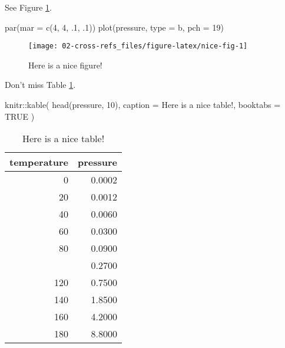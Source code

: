 \documentclass[
]{book}
\newenvironment{Shaded}{\begin{snugshade}}{\end{snugshade}}
\newcommand{\AttributeTok}[1]{\textcolor[rgb]{0.77,0.63,0.00}{#1}}
\newcommand{\ConstantTok}[1]{\textcolor[rgb]{0.00,0.00,0.00}{#1}}
\newcommand{\DecValTok}[1]{\textcolor[rgb]{0.00,0.00,0.81}{#1}}
\newcommand{\FunctionTok}[1]{\textcolor[rgb]{0.00,0.00,0.00}{#1}}
\newcommand{\NormalTok}[1]{#1}
\newcommand{\SpecialCharTok}[1]{\textcolor[rgb]{0.00,0.00,0.00}{#1}}
\newcommand{\StringTok}[1]{\textcolor[rgb]{0.31,0.60,0.02}{#1}}
\theoremstyle{definition}
\theoremstyle{definition}
\theoremstyle{definition}
\theoremstyle{definition}
\theoremstyle{remark}
\begin{document}
See Figure \ref{fig:nice-fig}.

\begin{Shaded}
\begin{Highlighting}[]
\FunctionTok{par}\NormalTok{(}\AttributeTok{mar =} \FunctionTok{c}\NormalTok{(}\DecValTok{4}\NormalTok{, }\DecValTok{4}\NormalTok{, .}\DecValTok{1}\NormalTok{, .}\DecValTok{1}\NormalTok{))}
\FunctionTok{plot}\NormalTok{(pressure, }\AttributeTok{type =} \StringTok{\textquotesingle{}b\textquotesingle{}}\NormalTok{, }\AttributeTok{pch =} \DecValTok{19}\NormalTok{)}
\end{Highlighting}
\end{Shaded}

\begin{figure}

{\centering \texttt{[image: 02-cross-refs\_files/figure-latex/nice-fig-1]} 

}

\caption{Here is a nice figure!}\label{fig:nice-fig}
\end{figure}

Don't miss Table \ref{tab:nice-tab}.

\begin{Shaded}
\begin{Highlighting}[]
\NormalTok{knitr}\SpecialCharTok{::}\FunctionTok{kable}\NormalTok{(}
  \FunctionTok{head}\NormalTok{(pressure, }\DecValTok{10}\NormalTok{), }\AttributeTok{caption =} \StringTok{\textquotesingle{}Here is a nice table!\textquotesingle{}}\NormalTok{,}
  \AttributeTok{booktabs =} \ConstantTok{TRUE}
\NormalTok{)}
\end{Highlighting}
\end{Shaded}

\begin{table}

\caption{\label{tab:nice-tab}Here is a nice table!}
\centering
\begin{tabular}[t]{rr}
\toprule
temperature & pressure\\
\midrule
0 & 0.0002\\
20 & 0.0012\\
40 & 0.0060\\
60 & 0.0300\\
80 & 0.0900\\
\addlinespace
100 & 0.2700\\
120 & 0.7500\\
140 & 1.8500\\
160 & 4.2000\\
180 & 8.8000\\
\bottomrule
\end{tabular}
\end{table}
\end{document}
